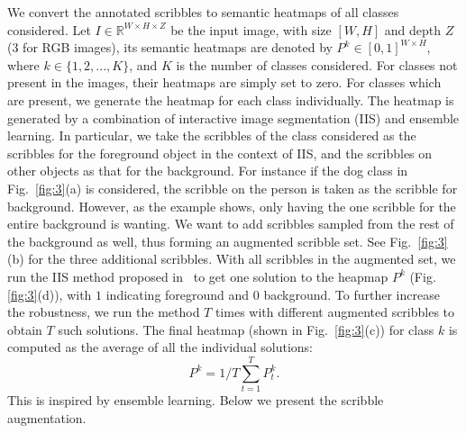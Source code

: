 \documentclass[runningheads]{llncs}
\begin{document}

We convert the annotated scribbles to semantic heatmaps of all classes
considered.  Let $I \in \mathbb{R}^{W \times H \times Z}$ be the input
image, with size $[W, H]$ and depth $Z$ (3 for RGB images), its
semantic heatmaps are denoted by $P^k \in [0,1]^{W \times H}$, where
$k \in \{1, 2, ...,K \}$, and $K$ is the number of classes
considered. For classes not present in the images, their heatmaps are
simply set to zero.  For classes which are present, we generate the
heatmap for each class individually. The heatmap is generated by a combination of interactive image segmentation (IIS) and ensemble learning. 
In particular, we take the scribbles of the class considered as
the scribbles for the foreground object in the context of IIS, and the
scribbles on other objects as that for the
background. For instance if the dog class in Fig.~\ref{fig:3}(a) is considered, the scribble on the person is taken as the scribble for background.
However, as the example shows, only having the one scribble for the entire background is wanting.  We want to add scribbles sampled from the rest
of the background as well, thus forming an augmented scribble set. See
Fig.~\ref{fig:3}(b) for the three additional scribbles. With all
scribbles in the augmented set, we run the IIS method proposed
in~\citep{geodesic:star} to get one solution to the heapmap $P^k$
(Fig.\ref{fig:3}(d)), with $1$ indicating foreground and $0$
background.
To further increase the robustness, we run the method
$T$ times with different augmented scribbles to obtain $T$ such
solutions. 
The final heatmap (shown in Fig.~\ref{fig:3}(c)) for class $k$ is
computed as the average of all the individual solutions:
\begin{equation}
  \label{eq:heatmap}
  P^k = 1/T \sum_{t=1}^T P^k_t.
\end{equation}
This is inspired by ensemble learning. Below we present the scribble augmentation.
\end{document}
